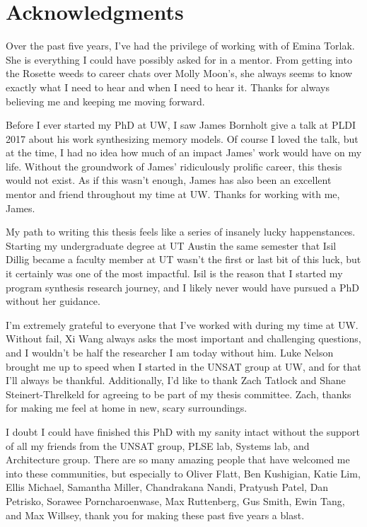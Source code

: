 \documentclass[12pt]{book}
\begin{document}
\begin{spacing}{1.5}
  \tableofcontents
\end{spacing}

\chapter*{Acknowledgments}

Over the past five years, I've had the privilege of working with
of Emina Torlak. She is everything I could have possibly asked for
in a mentor. From getting into the Rosette weeds to career chats over Molly Moon's,
she always seems to know exactly what I need to hear and when I need to hear it.
Thanks for always believing me and keeping me moving forward.

Before I ever started my PhD at UW, I saw James Bornholt give a talk at PLDI 2017
about his work synthesizing memory models. Of course I loved the talk,
but at the time, I had no idea how much of an impact James' work would
have on my life. Without the groundwork of James' ridiculously prolific
career, this thesis would not exist. As if this wasn't enough, James has
also been an excellent mentor and friend throughout my time at UW. 
Thanks for working with me, James.

My path to writing this thesis feels like a series of insanely lucky
happenstances. Starting my undergraduate degree at UT Austin
the same semester that Isil Dillig became a faculty member at UT wasn't the
first or last bit of this luck, but it certainly was one of the most impactful.
Isil is the reason that I started my program synthesis research journey, and I
likely never would have pursued a PhD without her guidance.

I'm extremely grateful to everyone that I've worked with during my time at UW.
Without fail, Xi Wang always asks the most important and challenging questions,
and I wouldn't be half the researcher I am today without him.
Luke Nelson brought me up to speed when I started in the UNSAT group at UW,
and for that I'll always be thankful.
Additionally, I'd like to thank Zach Tatlock and Shane Steinert-Threlkeld
for agreeing to be part of my thesis committee.
Zach, thanks for making me feel at home in new, scary surroundings.

I doubt I could have finished this PhD with my sanity intact without the support
of all my friends from the UNSAT group, PLSE lab, Systems lab, and Architecture
group. There are so many amazing people that have welcomed me into these communities,
but especially to
Oliver Flatt,
Ben Kushigian,
Katie Lim,
Ellis Michael,
Samantha Miller,
Chandrakana Nandi,
Pratyush Patel,
Dan Petrisko,
Sorawee Porncharoenwase,
Max Ruttenberg,
Gus Smith,
Ewin Tang,
and Max Willsey,
thank you for making these past five years a blast.
\end{document}
